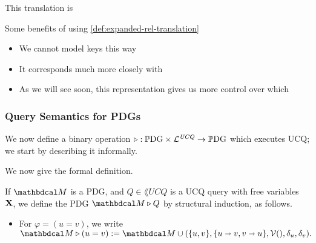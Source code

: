 \documentclass[the-pdg-manual.tex]{subfiles}
\begin{document}
This translation is

\begin{defn}\label{def:compact-rel-translation}
	
\end{defn}
Some benefits of using \cref{def:expanded-rel-translation}
\begin{itemize}[nosep]
	\item We cannot model keys this way
	\item It corresponds much more closely with 
	\item As we will see soon, this representation gives us more control over which 
\end{itemize}

\begin{defn}
\end{defn}


\subsubsection{Query Semantics for PDGs}

We now define a binary operation $\triangleright : \mathbb{P}\mathrm{DG} \times \mathcal L^{\mathit{UCQ}} \to \mathbb{P}\mathrm{DG}$ which executes UCQ; we 
start by describing it informally.

We now give the formal definition.
\begin{defn}[\texorpdfstring{$\qq$}{>}]
  If $\dg M$ is a PDG, and $Q \in \lang{UCQ}$ is a UCQ query with free variables $\mathbf X$, we define the PDG $\dg M \qq Q$ by structural induction, as follows.
  
  \begin{itemize}
  	\item For $\varphi = (u=v)$, we write $\dg M \qq  (u = v) :=  \dg M \cup (\{u,v\}, \{u\shortrightarrow v, v\shortrightarrow u\}, \V(), \delta_{u}, \delta_{v}).$
  \end{itemize}
\end{defn}
\end{document}
